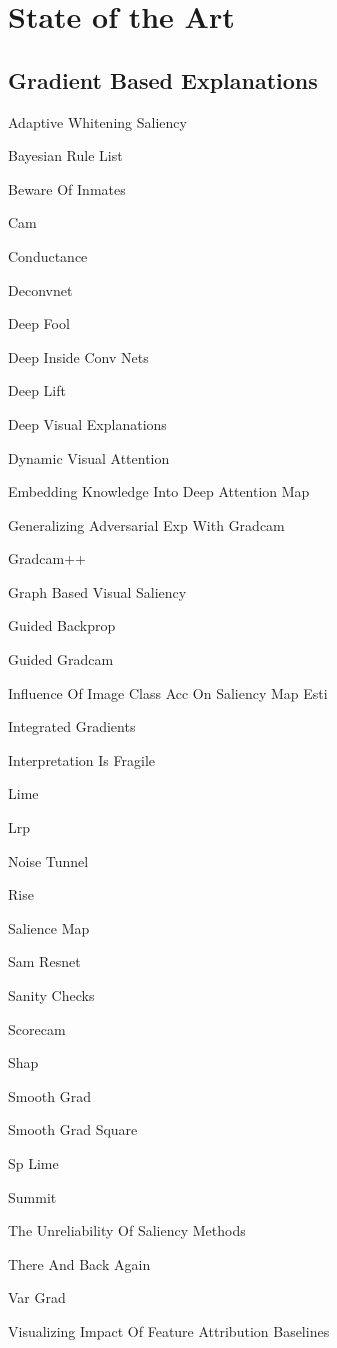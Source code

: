 \chapter{State of the Art}
\section{Gradient Based Explanations}

Adaptive Whitening Saliency

Bayesian Rule List

Beware Of Inmates

Cam

Conductance

Deconvnet

Deep Fool

Deep Inside Conv Nets

Deep Lift

Deep Visual Explanations

Dynamic Visual Attention

Embedding Knowledge Into Deep Attention Map

Generalizing Adversarial Exp With Gradcam

Gradcam++

Graph Based Visual Saliency

Guided Backprop

Guided Gradcam

Influence Of Image Class Acc On Saliency Map Esti

Integrated Gradients

Interpretation Is Fragile

Lime

Lrp

Noise Tunnel

Rise

Salience Map

Sam Resnet

Sanity Checks

Scorecam

Shap

Smooth Grad

Smooth Grad Square

Sp Lime

Summit

The Unreliability Of Saliency Methods

There And Back Again

Var Grad

Visualizing Impact Of Feature Attribution Baselines

